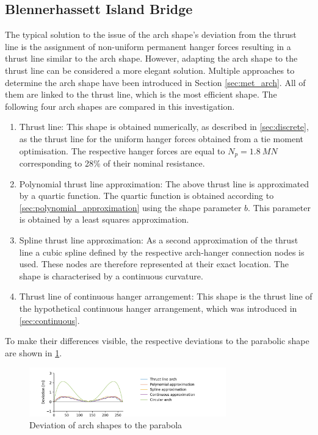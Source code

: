 \subsection{Blennerhassett Island Bridge} \label{sec:arch_shape_BIB}
The typical solution to the issue of the arch shape's deviation from the thrust line is the assignment of non-uniform permanent hanger forces resulting in a thrust line similar to the arch shape. However, adapting the arch shape to the thrust line can be considered a more elegant solution. 
Multiple approaches to determine the arch shape have been introduced in Section \ref{sec:met_arch}. All of them are linked to the thrust line, which is the most efficient shape. The following four arch shapes are compared in this investigation.
\begin{enumerate}
    \item Thrust line: This shape is obtained numerically, as described in \cref{sec:discrete}, as the thrust line for the uniform hanger forces obtained from a tie moment optimisation. The respective hanger forces are equal to $N_p=\SI{1.8}{MN}$ corresponding to 28\% of their nominal resistance.
    \item Polynomial thrust line approximation: The above thrust line is approximated by a quartic function. The quartic function is obtained according to \cref{sec:polynomial_approximation} using the shape parameter $b$. This parameter is obtained by a least squares approximation. 

    \item Spline thrust line approximation: As a second approximation of the thrust line a cubic spline defined by the respective arch-hanger connection nodes is used. These nodes are therefore represented at their exact location. The shape is characterised by a continuous curvature.
    \item Thrust line of continuous hanger arrangement: This shape is the thrust line of the hypothetical continuous hanger arrangement, which was introduced in \cref{sec:continuous}.
\end{enumerate}

To make their differences visible, the respective deviations to the parabolic shape are shown in \cref{fig:arch_shapes_13}. 

\begin{figure}[H]
    \centering
    \includegraphics[trim={1cm 0 3cm 0},clip, width=0.76\textwidth]{calculations/arch shape/arch_shapes_13.png}
    \caption{Deviation of arch shapes to the parabola}
    \label{fig:arch_shapes_13}
\end{figure}

